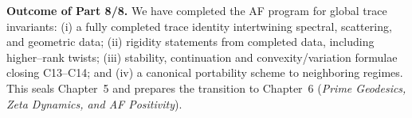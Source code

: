 
\noindent\textbf{Outcome of Part 8/8.}
We have completed the AF program for global trace invariants:
(i) a fully completed trace identity intertwining spectral, scattering, and geometric data;
(ii) rigidity statements from completed data, including higher–rank twists;
(iii) stability, continuation and convexity/variation formulae closing C13–C14; and
(iv) a canonical portability scheme to neighboring regimes. This seals Chapter~5 and prepares the transition to Chapter~6 (\emph{Prime Geodesics, Zeta Dynamics, and AF Positivity}). \relax\hspace{0pt} %


